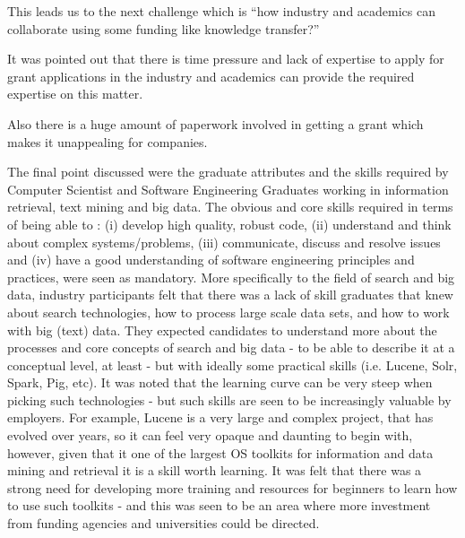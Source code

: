 This leads us to the next challenge which is ``how industry and academics can collaborate using some funding like knowledge transfer?''

It was pointed out that there is time pressure and lack of expertise to apply for grant applications in the industry and academics can provide the required expertise on this matter. 

Also there is a huge amount of paperwork involved in getting a grant which makes it unappealing for companies. 

The final point discussed were the graduate attributes and the skills required by Computer Scientist and Software Engineering Graduates working in information retrieval, text mining and big data. The obvious and core skills required in terms of being able to : (i) develop high quality, robust code, (ii) understand and think about complex systems/problems, (iii) communicate, discuss and resolve issues and (iv) have a good understanding of software engineering principles and practices, were seen as mandatory. More specifically to the field of search and big data, industry participants felt that there was a lack of skill graduates that knew about search technologies, how to process large scale data sets, and how to work with big (text) data. They expected candidates to understand more about the processes and core concepts of search and big data - to be able to describe it at a conceptual level, at least - but with ideally some practical skills (i.e. Lucene, Solr, Spark, Pig, etc). It was noted that the learning curve can be very steep when picking such technologies - but such skills are seen to be increasingly valuable by employers. For example, Lucene is a very large and complex project, that has evolved over years, so it can feel very opaque and daunting to begin with, however, given that it one of the largest OS toolkits for information and data mining and retrieval it is a skill worth learning. It was felt that there was a strong need for developing more training and resources for beginners to learn how to use such toolkits - and this was seen to be an area where more investment from funding agencies and universities could be directed. 


